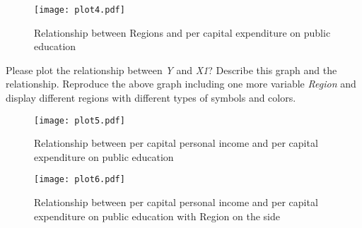 \documentclass[12pt,letterpaper]{article}
\begin{document}
\begin{itemize}
						\vspace{.5cm}
							\vspace{.5cm}
			
			 \begin{figure}\centering
				
				\caption{Relationship between Regions and per capital expenditure on public education}
				\texttt{[image: plot4.pdf]}
			\end{figure}
		 
        
    	
    	    	
		
		
			
		
	
	


    
	
		
		Please plot the relationship between \emph{Y} and \emph{X1}? Describe this graph and the relationship. Reproduce the above graph including one more variable \emph{Region} and display different regions with different types of symbols and colors.\\
		
			  
	      	\begin{figure}\centering
	      	
			\caption{Relationship between per capital personal income and per capital expenditure on public education}
			\texttt{[image: plot5.pdf]}
		    \end{figure}
		
		\vspace{.5cm}
		
	     	\begin{figure}\centering
			\caption{Relationship between per capital personal income and per capital expenditure on public education with Region on the side }
			\texttt{[image: plot6.pdf]}
		    \end{figure}

	\end{itemize}
	
\end{document}
